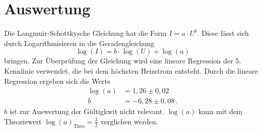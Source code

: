 \section{Auswertung}
\label{sec:Auswertung}
Die Langmuir-Schottkysche Gleichung hat die Form $I = a \cdot U^b$. Diese lässt sich durch Logarithmisieren 
in die Geradengleichung 
    \begin{equation*}
    \log(I) = b \cdot \log(U) + \log(a)
    \end{equation*}
bringen. Zur Überprüfung der Gleichung wird eine lineare Regression der 5. Kennlinie verwendet, die bei dem 
höchsten Heizstrom entsteht. Durch die lineare Regression ergeben sich 
die Werte
\begin{align}
    \log(a) &= 1,26 \pm 0,02 \\
    b &= -6,28 \pm 0,08 \, .
\end{align}
$b$ ist zur Auswertung der Gültigkwit nicht relevant. $\log(a)$ kann mit dem Theoriewert $\log(a)_{\text{Theo}}= \frac{3}{2}$ verglichen werden.


